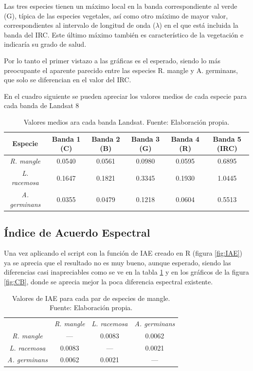 Las tres especies tienen un máximo local en la banda correspondiente al verde (G), típica de las especies vegetales, así como otro máximo de mayor valor, correspondientes al intervalo de longitud de onda ($\lambda$) en el que está incluida la banda del \ac{IRC}. Este último máximo también es característico de la vegetación e indicaría su grado de salud.\Sep

Por lo tanto el primer vistazo a las gráficas es el esperado, siendo lo más preocupante el aparente parecido entre las especies R. mangle y A. germinans, que solo se diferencian en el valor del \ac{IRC}.\Sep

En el cuadro siguiente se pueden apreciar los valores medios de cada especie para cada banda de Landsat 8

\begin{table}[ht]
	\centering
	\caption[Valores medios en las bandas Landsat]{Valores medios ara cada banda Landsat. Fuente: Elaboración propia.}
	\begin{tabular}{@{}cccccc@{}}
	\toprule[0.4mm]
	Especie & Banda 1 (C) & Banda 2 (B) & Banda 3 (G) & Banda 4 (R) & Banda 5 (IRC) \\
	\midrule
	\textit{R. mangle}	& 0.0540 & 0.0561 & 0.0980 & 0.0595 & 0.6895 \\
	\textit{L. racemosa} & 0.1647 & 0.1821 & 0.3345 & 0.1930 & 1.0445 \\
	\textit{A. germinans} & 0.0355 & 0.0479 & 0.1218 & 0.0604 & 0.5513 \\
	\bottomrule[0.4mm]
	\end{tabular}
\end{table}

\subsection{Índice de Acuerdo Espectral}
Una vez aplicando el script con la función de \ac{IAE} creado en R (figura \ref{fig:IAE}) ya se aprecia que el resultado no es muy bueno, aunque esperado, siendo las diferencias casi inapreciables como se ve en la tabla \ref{tab:Valores_IAE} y en los gráficos de la figura \ref{fig:CB}, donde se aprecia mejor la poca diferencia espectral existente.\Sep

\begin{table}[ht]
	\centering
	\caption[Valores de IAE]{Valores de \ac{IAE} para cada par de especies de mangle. Fuente: Elaboración propia.}
	\begin{tabular}{@{}cccc@{}}
	\toprule
	& \textit{R. mangle} & \textit{L. racemosa} & \textit{A. germinans} \\
	\textit{R. mangle} & --- & 0.0083 & 0.0062 \\
	\textit{L. racemosa} & 0.0083 & --- & 0.0021 \\
	\textit{A. germinans} & 0.0062 & 0.0021 & --- \\
	\bottomrule[0.4mm]
	\end{tabular}
	\label{tab:Valores_IAE}
\end{table}

